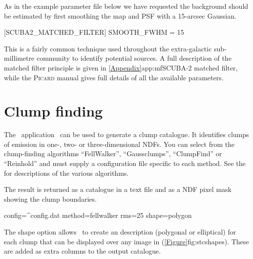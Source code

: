 \begin{terminalv}
\end{terminalv}

As in the example parameter file below we have requested the
background should be estimated by first smoothing the map and PSF with
a 15-arcsec Gaussian.

\begin{terminalv}

[SCUBA2_MATCHED_FILTER]
SMOOTH_FWHM = 15

\end{terminalv}

This is a fairly common technique used throughout the extra-galactic
sub-millimetre community to identify potential sources. A full
description of the matched filter principle is given in
\cref{Appendix}{app:mf}{SCUBA-2 matched filter}, while the
\textsc{Picard} manual gives full details of all the available
parameters.

\section{Clump finding}
\label{sec:clumps}
\label{sec:clumpfind}

The \cupid\ application \findclumps\ can be used to generate a clump
catalogue. It identifies clumps of emission in one-, two- or
three-dimensional NDFs. You can select from the clump-finding
algorithms ``FellWalker''\cite{fellwalker}, ``Gaussclumps'',
``ClumpFind'' or ``Reinhold'' and must supply a configuration file
specific to each method. See the 
for descriptions of the various algorithms.

The result is returned as a catalogue in a text file and as a NDF
pixel mask showing the clump boundaries.

\begin{terminalv}
  config=^config.dat method=fellwalker rms=25 shape=polygon
\end{terminalv}

The shape option allows \findclumps\ to create an
description (polygonal or elliptical) for each clump that
can be displayed over any image in \gaia (\cref{Figure}{fig:stcshapes}{}).
These are added as extra columns to the output catalogue.

